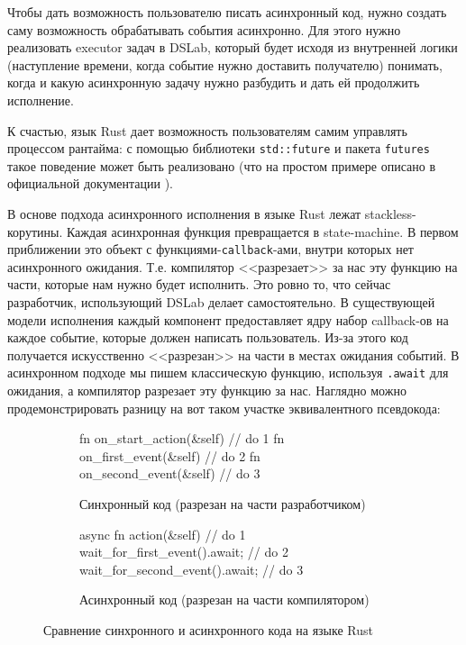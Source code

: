 Чтобы дать возможность пользователю писать асинхронный код, нужно создать саму возможность обрабатывать события асинхронно. Для этого нужно реализовать executor задач в DSLab, который будет исходя из внутренней логики (наступление времени, когда событие нужно доставить получателю) понимать, когда и какую асинхронную задачу нужно разбудить и дать ей продолжить исполнение. 

К счастью, язык Rust дает возможность пользователям самим управлять процессом рантайма: с помощью библиотеки \texttt{std::future}\cite{rust-std-future} и пакета \texttt{futures}\cite{rust-futures} такое поведение может быть реализовано (что на простом примере описано в официальной документации \cite{async-book}).

В основе подхода асинхронного исполнения в языке Rust лежат stackless-корутины. Каждая асинхронная функция превращается в state-machine. В первом приближении это объект с функциями-\texttt{callback}-ами, внутри которых нет асинхронного ожидания. Т.е. компилятор <<разрезает>> за нас эту функцию на части, которые нам нужно будет исполнить. Это ровно то, что сейчас разработчик, использующий DSLab делает самостоятельно. В существующей модели исполнения каждый компонент предоставляет ядру набор callback-ов на каждое событие, которые должен написать пользователь. Из-за этого код получается искусственно <<разрезан>> на части в местах ожидания событий. В асинхронном подходе мы пишем классическую функцию, используя \texttt{.await} для ожидания, а компилятор разрезает эту функцию за нас. Наглядно можно продемонстрировать разницу на вот таком участке эквивалентного псевдокода: 

\begin{figure}[H]
    \centering
    \begin{subfigure}[b]{0.45\linewidth}
        \small
        \centering
        \begin{rustcode}
fn on_start_action(&self) {
    // do 1
}
fn on_first_event(&self) {
    // do 2
}
fn on_second_event(&self) {
    // do 3
}
    \end{rustcode}
        \caption{Синхронный код (разрезан на части разработчиком)}
        \label{sync-async-example:sync}
    \end{subfigure}
    \hfill
    \begin{subfigure}[b]{0.51\linewidth}
        \small
        \centering
        \begin{rustcode}
async fn action(&self) {
    // do 1
    wait_for_first_event().await;
    // do 2 
    wait_for_second_event().await;
    // do 3
}
    \end{rustcode}
        \caption{Асинхронный код (разрезан на части компилятором)}
        \label{sync-async-example:async}
    \end{subfigure}
\caption{Сравнение синхронного и асинхронного кода на языке Rust}
\label{sync-async-example}
\end{figure}

